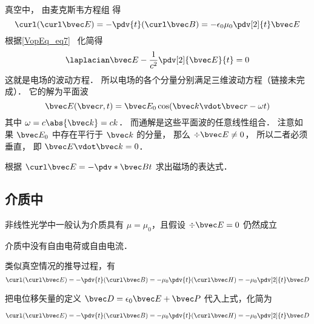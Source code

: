 
\begin{issues}
\issueDraft
\end{issues}


真空中， 由麦克斯韦方程组 得
\begin{equation}
\curl(\curl\bvec E) = -\pdv{t} (\curl\bvec B) = -\epsilon_0\mu_0 \pdv[2]{t} \bvec E
\end{equation}
根据\autoref{VopEq_eq7}~ 化简得
\begin{equation}
\laplacian \bvec E - \frac{1}{c^2} \pdv[2]{\bvec E}{t} = 0
\end{equation}
这就是电场的波动方程． 所以电场的各个分量分别满足三维波动方程（链接未完成）． 它的解为平面波
\begin{equation}
\bvec E(\bvec r, t) = \bvec E_0 \cos(\bvec k\vdot \bvec r - \omega t)
\end{equation}
其中 $\omega = c\abs{\bvec k} = ck$． 而通解是这些平面波的任意线性组合． 注意如果 $\bvec E_0$ 中存在平行于 $\bvec k$ 的分量， 那么 $\div \bvec E \ne 0$， 所以二者必须垂直， 即 $\bvec E \vdot \bvec k = 0$．

根据 $\curl \bvec E = -\pdv*{\bvec B}{t}$ 求出磁场的表达式．

\subsection{介质中}

非线性光学中一般认为介质具有 $\mu = \mu_0$，且假设 $\div\bvec E = 0$ 仍然成立

介质中没有自由电荷或自由电流．

类似真空情况的推导过程，有
\begin{equation}
\curl(\curl\bvec E) = -\pdv{t} (\curl\bvec B) = -\mu_0 \pdv{t} (\curl\bvec H)
= -\mu_0 \pdv[2]{t} \bvec D
\end{equation}

把电位移矢量的定义 $\bvec D = \epsilon_0\bvec E + \bvec P$ 代入上式，化简为

\begin{equation}
\curl(\curl\bvec E) = -\pdv{t} (\curl\bvec B) = -\mu_0 \pdv{t} (\curl\bvec H)
= -\mu_0 \pdv[2]{t} \bvec D
\end{equation}